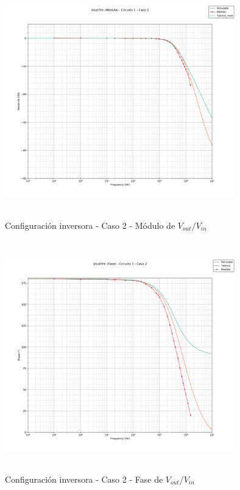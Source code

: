 \begin{figure}[H] %
	\centering
	\includegraphics[width=10cm,height=10cm,keepaspectratio]{../EJ1/00GRAFICOS/c1c2/c1c2voviMod.png}
	\caption{Configuración inversora - Caso 2 - Módulo de $V_{out}/V_{in}$}
	\label{c1c2voviM}
\end{figure}

\begin{figure}[H] %
	\centering
	\includegraphics[width=10cm,height=10cm,keepaspectratio]{../EJ1/00GRAFICOS/c1c2/c1c2voviFASE.png}
	\caption{Configuración inversora - Caso 2 - Fase de $V_{out}/V_{in}$ }
	\label{c1c2voviP}
\end{figure}

